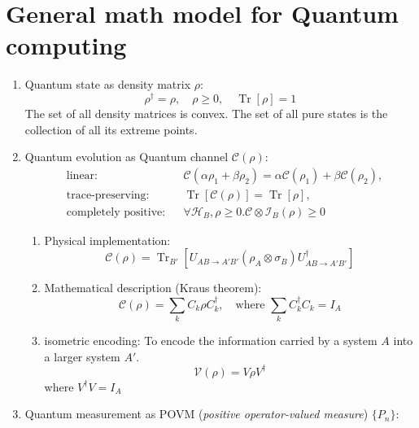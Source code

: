 \documentclass[11pt,a4paper]{article}%
\numberwithin{equation}{section}
\newcommand{\Tr}{\operatorname{Tr}}
\begin{document}
\section{General math model for Quantum computing} %
\label{sec:general_math_model_for_quantum_computing}
\begin{enumerate}
    \item Quantum state as density matrix $\rho$: 
    \begin{equation}
      \rho^\dagger = \rho, \quad \rho \ge 0,\quad \Tr[\rho] = 1
    \end{equation}
    The set of all density matrices is convex. The set of all pure states is the collection of all its extreme points.
    \item Quantum evolution as Quantum channel $\mathscr C(\rho)$:
    \begin{align}
      &\mbox{linear:}&&\mathscr C(\alpha\rho_1 + \beta \rho_2) = \alpha\mathscr C(\rho_1) + \beta\mathscr C(\rho_2),\\
      &\mbox{trace-preserving:}&&\Tr[\mathscr C(\rho)] = \Tr[\rho],\\
      &\mbox{completely positive:}&&\forall \mathcal H_B,\rho\ge 0. \mathscr C\otimes \mathscr I_B (\rho) \ge 0
    \end{align}
    \begin{enumerate}
        \item Physical implementation:
        \begin{equation}
          \mathscr C(\rho) = \Tr_{B'}\left[U_{AB\rightarrow A'B'}(\rho_A\otimes\sigma_B)U^\dagger_{AB\rightarrow A'B'}\right]
        \end{equation}
        \item Mathematical description (Kraus theorem):
        \begin{equation}
          \mathscr C(\rho) = \sum_k C_k \rho C_k^\dagger, \quad \mbox{where }\sum_kC_k^\dagger C_k = I_A
        \end{equation}
        \item isometric encoding: To encode the information carried by a system $A$ into a larger system $A'$.
        \begin{equation}
            \mathscr V(\rho) = V\rho V^\dagger
        \end{equation}
        where $V^\dagger V = I_A$
    \end{enumerate}
    \item Quantum measurement as POVM (\textit{positive operator-valued measure}) $\{P_n\}$:

\end{enumerate}
\end{document}
